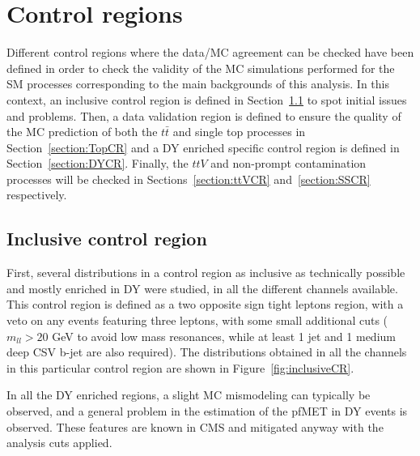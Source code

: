 \documentclass[a4paper, 10pt, openright]{report}
\begin{document}
\section{Control regions} \label{section:CR}

Different control regions where the data/\ac{MC} agreement can be checked have been defined in order to check the validity of the \ac{MC} simulations performed for the \ac{SM} processes corresponding to the main backgrounds of this analysis. In this context, an inclusive control region is defined in Section~\ref{section:inclusiveCR} to spot initial issues and problems. Then, a data validation region is defined to ensure the quality of the \ac{MC} prediction of both the $t \bar t$ and single top processes in Section~\ref{section:TopCR} and a \ac{DY} enriched specific control region is defined in Section~\ref{section:DYCR}. Finally, the $ttV$ and non-prompt contamination processes will be checked in Sections~\ref{section:ttVCR} and~\ref{section:SSCR} respectively.

\subsection{Inclusive control region} \label{section:inclusiveCR}

First, several distributions in a control region as inclusive as technically possible and mostly enriched in \ac{DY} were studied, in all the different channels available. This control region is defined as a two opposite sign tight leptons region, with a veto on any events featuring three leptons, with some small additional cuts ($m_{ll} > 20$ GeV to avoid low mass resonances, while at least 1 jet and 1 medium deep CSV b-jet are also required). The distributions obtained in all the channels in this particular control region are shown in Figure~\ref{fig:inclusiveCR}. 

In all the \ac{DY} enriched regions, a slight \ac{MC} mismodeling can typically be observed, and a general problem in the estimation of the pf\ac{MET} in \ac{DY} events is observed. These features are known in \ac{CMS} and mitigated anyway with the analysis cuts applied.
\end{document}

